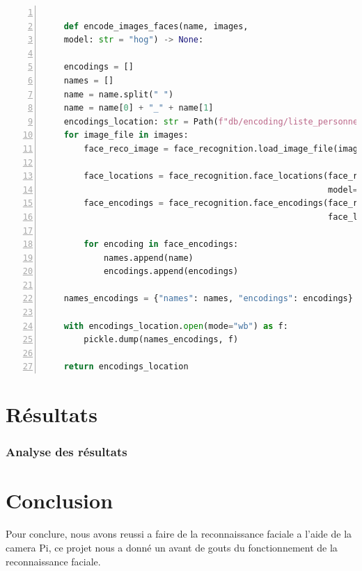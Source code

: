 \documentclass{article}
\begin{document}
\begin{lstlisting}[language=python, caption={Fonction qui encode les caracteristiques du visage d'un indivudu}, label=code:exemple, numbers=left, frame=single, framerule=1pt, linewidth=\textwidth]
    
    def encode_images_faces(name, images,
    model: str = "hog") -> None:
    
    encodings = []
    names = []
    name = name.split(" ")
    name = name[0] + "_" + name[1]
    encodings_location: str = Path(f"db/encoding/liste_personne/{name}.plk") 
    for image_file in images:
        face_reco_image = face_recognition.load_image_file(image_file)

        face_locations = face_recognition.face_locations(face_reco_image,
                                                         model=model)
        face_encodings = face_recognition.face_encodings(face_reco_image,
                                                         face_locations)

        for encoding in face_encodings:
            names.append(name)
            encodings.append(encodings)
        
    names_encodings = {"names": names, "encodings": encodings}

    with encodings_location.open(mode="wb") as f:
        pickle.dump(names_encodings, f)
    
    return encodings_location
\end{lstlisting}


\part{Résultats}
\section{Analyse des résultats}



\part{Conclusion}

Pour conclure, nous avons reussi a faire de la reconnaissance faciale a l'aide de la camera Pi, ce projet nous a donné un avant de gouts
du fonctionnement de la reconnaissance faciale.
\end{document}
